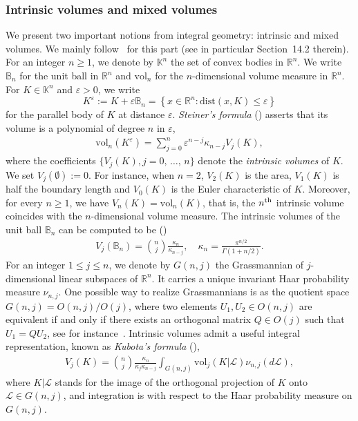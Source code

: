\documentclass[10pt]{amsart}
\theoremstyle{definition}\newtheorem{defi}[theo]{Definition}\newtheorem{rema}[theo]{Remark}\newtheorem{exam}[theo]{Example}\newtheorem{exem}[theo]{Example}\newtheorem{nota}[theo]{Notation}
\newcommand{\scL}{\mathscr{L}}
\newcommand{\rvol}{\mathrm{vol}}
\newcommand{\dist}{\mathrm{dist}}
\newcommand{\R}{\mathbb{R}}
\newcommand{\bbB}{\mathbb{B}}
\newcommand{\bbK}{\mathbb{K}}
\newcommand{\eps}{\varepsilon}
\begin{document}
\subsubsection*{Intrinsic volumes and mixed volumes}
We present two important notions from integral geometry: intrinsic and mixed volumes. We mainly follow~\cite{Schneider} for this part (see in particular Section~14.2 therein). For an integer $n\geq1$, we denote by $\bbK^n$ the set of convex bodies in $\R^n$. We write $\bbB_n$ for the unit ball in $\R^n$ and $\rvol_n$ for the $n$-dimensional volume measure in $\R^n$. For $K \in \bbK^n$ and $\eps >0$, we write
\begin{equation*}
K^{\eps}:= K+\eps\bbB_n = \left\{ x\in \R^n: \dist(x,K) \leq \eps\right\}
\end{equation*}
for the parallel body of $K$ at distance $\eps$. \emph{Steiner's formula} (\cite[Eq.~(14.5)]{Schneider}) asserts that its volume is a polynomial of degree $n$ in $\eps$,
\begin{gather}\label{Steiner}
\rvol_n(K^{\eps}) = \sum_{j=0}^n \eps^{n-j} \kappa_{n-j} V_j(K),
\end{gather}
where the coefficients $\{V_j(K), j=0,\,\ldots,\,n\}$ denote the \emph{intrinsic volumes} of $K$. We set $V_j(\emptyset):=0$. For instance, when $n=2$, $V_2(K)$ is the area, $V_1(K)$ is half the boundary length and $V_0(K)$ is the Euler characteristic of $K$. Moreover, for every $n\geq 1$, we have $V_n(K)=\rvol_n(K)$, that is, the $n^{\rm th}$ intrinsic volume coincides with the $n$-dimensional volume measure. The intrinsic volumes of the unit ball $\bbB_n$ can be computed to be (\cite[Eq.~(14.8)]{Schneider})
\begin{gather*}
V_j(\bbB_n) = \binom{n}{j} \frac{\kappa_{n}}{\kappa_{n-j}}, \quad \kappa_{n}= \frac{\pi^{n/2}}{\Gamma(1+n/2)}.
\end{gather*}
For an integer $1\leq j\leq n$, we denote by $G(n,j)$ the Grassmannian of $j$-dimensional linear subspaces of $\R^n$. It carries a unique invariant Haar probability measure $\nu_{n,j}$. One possible way to realize Grassmannians is as the quotient space $G(n,j) = O(n,j)/O(j)$, where two elements $U_1,U_2 \in O(n,j)$ are equivalent if and only if there exists an orthogonal matrix $Q \in O(j)$ such that $U_1= QU_2$, see for instance~\cite[p.~8-9]{Ch2012}. Intrinsic volumes admit a useful integral representation, known as \emph{Kubota's formula} (\cite[Eq.~(6.11)]{Schneider}),
\begin{gather}\label{Kubota}
V_j(K) = \binom{n}{j}\frac{\kappa_n}{\kappa_j \kappa_{n-j}}\int_{G(n,j)} \rvol_j(K|\scL) \nu_{n,j}(d\scL),
\end{gather}
where $K|\scL$ stands for the image of the orthogonal projection of $K$ onto $\scL \in G(n,j)$, and integration is with respect to the Haar probability measure on $G(n,j)$.
\end{document}
